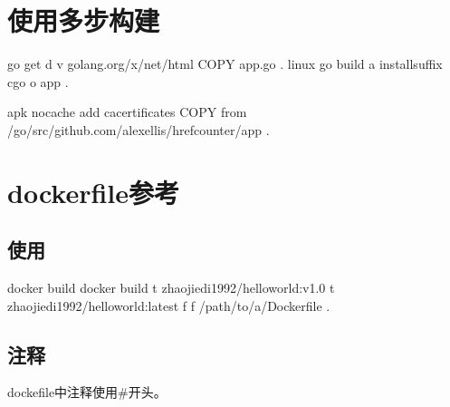 \documentclass[letterpaper,10pt,english]{sphinxmanual}
\begin{document}
\chapter{使用多步构建}
\label{\detokenize{_u8fd0_u884c_u5e94_u7528/04-_u4f7f_u7528_u591a_u6b65_u6784_u5efa::doc}}\label{\detokenize{_u8fd0_u884c_u5e94_u7528/04-_u4f7f_u7528_u591a_u6b65_u6784_u5efa:id1}}
%
\begin{sphinxVerbatim}[commandchars=\\\{\}]
 go get \PYGZhy{}d \PYGZhy{}v golang.org/x/net/html
COPY app.go .
  linux go build \PYGZhy{}a \PYGZhy{}installsuffix cgo \PYGZhy{}o app .

 apk \PYGZhy{}\PYGZhy{}no\PYGZhy{}cache add ca\PYGZhy{}certificates
COPY \PYGZhy{}\PYGZhy{}from /go/src/github.com/alexellis/href\PYGZhy{}counter/app .
\end{sphinxVerbatim}


\chapter{dockerfile参考}
\label{\detokenize{_u8fd0_u884c_u5e94_u7528/05-dockerfile_u53c2_u8003::doc}}\label{\detokenize{_u8fd0_u884c_u5e94_u7528/05-dockerfile_u53c2_u8003:dockerfile}}

\section{使用}
\label{\detokenize{_u8fd0_u884c_u5e94_u7528/05-dockerfile_u53c2_u8003:id1}}
%
\begin{sphinxVerbatim}[commandchars=\\\{\}]
docker build
docker build \PYGZhy{}t zhaojiedi1992/helloworld:v1.0 \PYGZhy{}t zhaojiedi1992/helloworld:latest  \PYGZhy{}f  \PYGZhy{}f /path/to/a/Dockerfile .
\end{sphinxVerbatim}


\section{注释}
\label{\detokenize{_u8fd0_u884c_u5e94_u7528/05-dockerfile_u53c2_u8003:id2}}
dockefile中注释使用\#开头。
\end{document}
